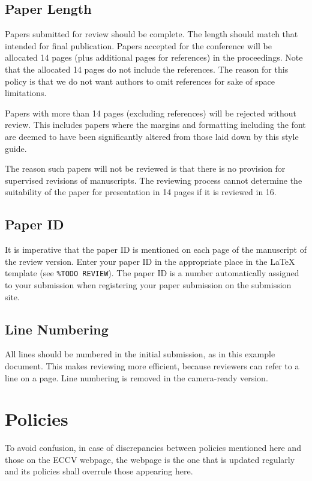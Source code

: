 \documentclass[runningheads]{llncs}
\begin{document}
\subsection{Paper Length}
Papers submitted for review should be complete. 
The length should match that intended for final publication. 
Papers accepted for the conference will be allocated 14 pages (plus additional pages for references) in the proceedings. 
Note that the allocated 14 pages do not include the references. 
The reason for this policy is that we do not want authors to omit references for sake of space limitations.

Papers with more than 14 pages (excluding references) will be rejected without review.
This includes papers where the margins and formatting including the font are deemed to have been significantly altered from those laid down by this style guide.

The reason such papers will not be reviewed is that there is no provision for supervised revisions of manuscripts. 
The reviewing process cannot determine the suitability of the paper for presentation in 14 pages if it is reviewed in 16.


\subsection{Paper ID}
It is imperative that the paper ID is mentioned on each page of the manuscript of the review version.
Enter your paper ID in the appropriate place in the \LaTeX{} template (see \texttt{\%TODO REVIEW}).
The paper ID is a number automatically assigned to your submission when registering your paper submission on the submission site.


\subsection{Line Numbering}
\label{sec:line-numbering}
All lines should be numbered in the initial submission, as in this example document. 
This makes reviewing more efficient, because reviewers can refer to a line on a page. 
Line numbering is removed in the camera-ready version.


\section{Policies}
To avoid confusion, in case of discrepancies between policies mentioned here and those on the ECCV \ECCVyear{} webpage, the webpage is the one that is updated regularly and its policies shall overrule those appearing here. 
\end{document}
